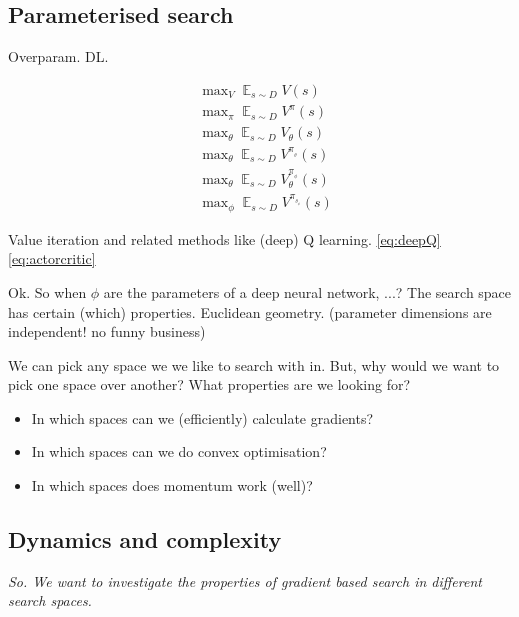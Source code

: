 \subsection{Parameterised search}

Overparam. DL. \cite{Arora2018}

\begin{align}
&\mathop{\text{max}}_V \mathop{\mathbb E}_{s\sim D} V(s) \\
&\mathop{\text{max}}_{\pi} \mathop{\mathbb E}_{s\sim D}V^{\pi}(s) \\
&\mathop{\text{max}}_{\theta} \mathop{\mathbb E}_{s\sim D} V_{\theta}(s)\label{eq:deepQ}\\
&\mathop{\text{max}}_{\theta} \mathop{\mathbb E}_{s\sim D} V^{\pi_{_{\theta}}}(s) \\
&\mathop{\text{max}}_{\theta} \mathop{\mathbb E}_{s\sim D} V_{\theta}^{\pi_{_{\phi}}}(s)\label{eq:actorcritic} \\
&\mathop{\text{max}}_{\phi} \mathop{\mathbb E}_{s\sim D} V^{\pi_{_{\theta_{\phi}}}}(s)
\end{align}

Value iteration and related methods like (deep) Q learning. \eqref{eq:deepQ}
\eqref{eq:actorcritic}

Ok. So when $\phi$ are the parameters of a deep neural network, ...? The search space has certain (which) properties.
Euclidean geometry.
(parameter dimensions are independent! no funny business)

We can pick any space we we like to search with in. But, why would we want to pick one space over another?
What properties are we looking for?

\begin{itemize}
\tightlist
\item In which spaces can we (efficiently) calculate gradients?
\item In which spaces can we do convex optimisation?
\item In which spaces does momentum work (well)?
\end{itemize}

\subsection{Dynamics and complexity}

\begin{displayquote}
  \textit{So. We want to investigate the properties of gradient based search in different search spaces.}
\end{displayquote}

